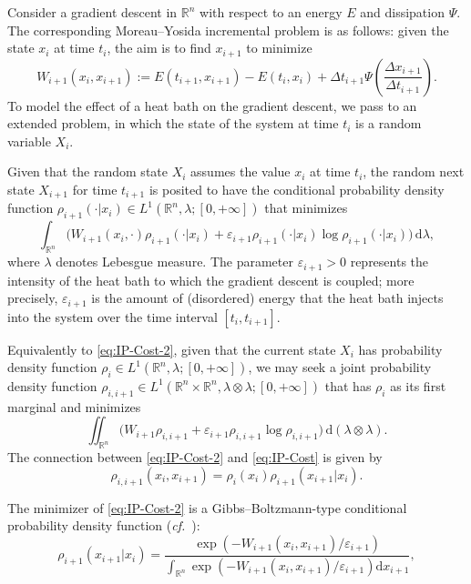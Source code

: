 \documentclass[reqno]{amsart}
\theoremstyle{definition}
\begin{document}
Consider a gradient descent in ${\mathbb{R}}^{n}$ with respect to an energy $E$ and dissipation $\Psi$.  The corresponding Moreau--Yosida incremental problem is as follows:  given the state $x_{i}$ at time $t_{i}$, the aim is to find $x_{i + 1}$ to minimize
\[
	W_{i + 1}(x_{i}, x_{i + 1}) := E(t_{i + 1}, x_{i + 1}) - E(t_{i}, x_{i}) + \Delta t_{i + 1} \Psi \left( \frac{\Delta x_{i + 1}}{\Delta t_{i + 1}} \right).
\]
To model the effect of a heat bath on the gradient descent, we pass to an extended problem, in which the state of the system at time $t_{i}$ is a random variable $X_{i}$.  

Given that the random state $X_{i}$ assumes the value $x_{i}$ at time $t_{i}$, the random next state $X_{i + 1}$ for time $t_{i + 1}$ is posited to have the conditional probability density function $\rho_{i + 1}(\cdot | x_{i}) \in L^{1}({\mathbb{R}}^{n}, \lambda; [0, +\infty])$ that minimizes
\begin{equation}
	\label{eq:IP-Cost-2}
	\int_{{\mathbb{R}}^{n}} \big( W_{i + 1}(x_{i}, \cdot) \rho_{i + 1} (\cdot|x_{i}) + {\varepsilon}_{i + 1} \rho_{i + 1} (\cdot|x_{i}) \log \rho_{i + 1} (\cdot|x_{i}) \big) \, {\mathrm{d}} \lambda,
\end{equation}
where $\lambda$ denotes Lebesgue measure.  The parameter ${\varepsilon}_{i + 1} > 0$ represents the intensity of the heat bath to which the gradient descent is coupled;  more precisely, ${\varepsilon}_{i + 1}$ is the amount of (disordered) energy that the heat bath injects into the system over the time interval $[t_{i}, t_{i + 1}]$.  

Equivalently to \eqref{eq:IP-Cost-2}, given that the current state $X_{i}$ has probability density function $\rho_{i} \in L^{1}({\mathbb{R}}^{n}, \lambda; [0, +\infty])$, we may seek a joint probability density function $\rho_{i, i + 1} \in L^{1}({\mathbb{R}}^{n}  \times {\mathbb{R}}^{n}, \lambda \otimes \lambda; [0, +\infty])$ that has $\rho_{i}$ as its first marginal and minimizes
\begin{equation}
	\label{eq:IP-Cost}
	\iint_{{\mathbb{R}}^{n}} \big( W_{i + 1} \rho_{i, i + 1} + {\varepsilon}_{i + 1} \rho_{i, i + 1} \log \rho_{i, i + 1} \big) \, {\mathrm{d}} (\lambda \otimes \lambda).
\end{equation}
The connection between \eqref{eq:IP-Cost-2} and \eqref{eq:IP-Cost} is given by
\[
	\rho_{i, i + 1}(x_{i}, x_{i + 1}) = \rho_{i}(x_{i}) \rho_{i + 1} (x_{i + 1}|x_{i}).
\]

The minimizer of \eqref{eq:IP-Cost-2} is a Gibbs--Boltzmann-type conditional probability density function (\emph{cf.}\ \cite{JordanKinderlehrer:1996, JordanKinderlehrerOtto:1998}):
\begin{equation}
	\label{eq:Gibbsian_pdf}
	\rho_{i + 1} (x_{i + 1}|x_{i}) = \frac{\exp \left( - W_{i + 1}(x_{i},x_{i + 1}) / {\varepsilon}_{i + 1} \right)}{\int_{{\mathbb{R}}^{n}} \exp \left( - W_{i + 1}(x_{i},x_{i + 1}) / {\varepsilon}_{i + 1} \right) {\mathrm{d}} x_{i + 1}},
\end{equation}
\end{document}
